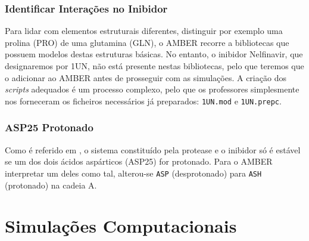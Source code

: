 \documentclass[12pt,a4paper]{article}
\begin{document}
\subsubsection{Identificar Interações no Inibidor}\label{sec:vis:inibidor}
	Para lidar com elementos estruturais diferentes, distinguir por exemplo uma prolina (PRO) de uma glutamina (GLN), o AMBER recorre a bibliotecas que possuem modelos destas estruturas básicas. No entanto, o inibidor Nelfinavir, que designaremos por 1UN, não está presente nestas bibliotecas, pelo que teremos que o adicionar ao AMBER antes de prosseguir com as simulações. A criação dos \textit{scripts} adequados é um processo complexo, pelo que os professores simplesmente nos forneceram os ficheiros necessários já preparados: \verb|1UN.mod| e \verb|1UN.prepc|.
	
\subsubsection{ASP25 Protonado}
	Como é referido em \cite{UnravelingHIVProtease,soaresDatasetShowingImpact2016,SubstrateRecognitionHIV1}, o sistema constituído pela protease e o inibidor só é estável se um dos dois ácidos aspárticos (ASP25) for protonado. Para o AMBER interpretar um deles como tal, alterou-se \verb|ASP| (desprotonado) para \verb|ASH| (protonado) na cadeia A.
	
	
	
	
	
\section{Simulações Computacionais}
	
\end{document}
